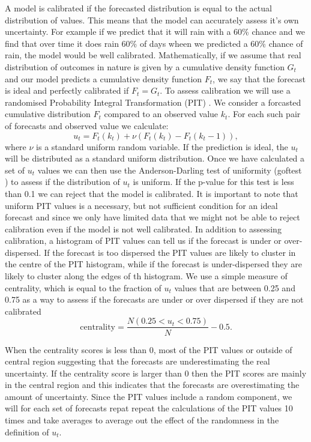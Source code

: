 \documentclass[12pt]{article}
\begin{document}
A model is calibrated if the forecasted distribution is equal to the actual distribution of values. This means that the model can accurately assess it's own uncertainty. For example if we predict that it will rain with a 60\% chance and we find that over time it does rain 60\% of days wheen we predicted a 60\% chance of rain, the model would be well calibrated. Mathematically, if we assume that real distribution of outcomes in nature is given by a cumulative density function $G_t$ and our model predicts a cumulative density function $F_t$, we say that the forecast is ideal and perfectly calibrated if $F_t=G_t$. To assess calibration we will use a randomised Probability Integral Transformation (PIT) \cite{czadoPredictiveModelAssessment2009a}. We consider a forcasted cumulative distribution $F_t$ compared to an observed value $k_t$. For each such pair of forecasts and observed value we calculate:
\[ u_t = F_t(k_t) + \nu (F_t(k_t) - F_t(k_t -1)),\]
where $\nu$ is a standard uniform random variable. If the prediction is ideal, the $u_t$ will be distributed as a standard uniform distribution. Once we have calculated a set of $u_t$ values we can then use the Anderson-Darling test of uniformity (goftest \cite{farawayGoftestClassicalGoodnessofFit2017}) to assess if the distribution of $u_t$ is uniform. If the p-value for this test is less than 0.1 we can reject that the model is calibrated. It is important to note that uniform PIT values is a necessary, but not sufficient condition for an ideal forecast and since we only have limited data that we might not be able to reject calibration even if the model is not well calibrated. In addition to assessing calibration, a histogram of PIT values can tell us if the forecast is under or over-dispersed\cite{czadoPredictiveModelAssessment2009a}. If the forecast is too dispersed the PIT values are likely to cluster in the centre of the PIT histogram, while if the forecast is under-dispersed they are likely to cluster along the edges of th histogram. We use a simple measure of centrality, which is equal to the fraction of $u_t$ values that are between 0.25 and 0.75 as a way to assess if the forecasts are under or over dispersed if they are not calibrated
\[\text{centrality} = \frac{N(0.25 < u_t < 0.75)}{N} - 0.5.\]

When the centrality scores is less than 0, most of the PIT values or outside of central region suggesting that the forecasts are underestimating the real uncertainty.  If the centrality score is larger than 0 then the PIT scores are mainly in the central region and this indicates that the forecasts are overestimating the amount of uncertainty. Since the PIT values include a random component, we will for each set of forecasts repat repeat the calculations of the PIT values 10 times and take averages to average out the effect of the randomness in the definition of $u_t$. 
\end{document}
